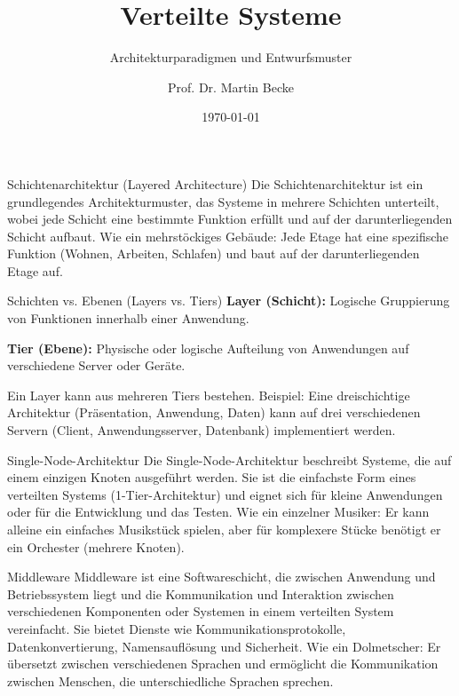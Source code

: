 \documentclass{beamer}
\title{Verteilte Systeme}
\subtitle{Architekturparadigmen und Entwurfsmuster}
\author{Prof. Dr. Martin Becke}
\date{\today}
\begin{document}
\begin{frame}
    \titlepage
\end{frame}

\begin{frame}{Schichtenarchitektur (Layered Architecture)}
    Die Schichtenarchitektur ist ein grundlegendes Architekturmuster, das Systeme in mehrere Schichten unterteilt, wobei jede Schicht eine bestimmte Funktion erfüllt und auf der darunterliegenden Schicht aufbaut.  Wie ein mehrstöckiges Gebäude: Jede Etage hat eine spezifische Funktion (Wohnen, Arbeiten, Schlafen) und baut auf der darunterliegenden Etage auf.
\end{frame}


\begin{frame}{Schichten vs. Ebenen (Layers vs. Tiers)}
    \textbf{Layer (Schicht):} Logische Gruppierung von Funktionen innerhalb einer Anwendung.

    \textbf{Tier (Ebene):}  Physische oder logische Aufteilung von Anwendungen auf verschiedene Server oder Geräte.

    Ein Layer kann aus mehreren Tiers bestehen.  Beispiel: Eine dreischichtige Architektur (Präsentation, Anwendung, Daten) kann auf drei verschiedenen Servern (Client, Anwendungsserver, Datenbank) implementiert werden.
\end{frame}


\begin{frame}{Single-Node-Architektur}
    Die Single-Node-Architektur beschreibt Systeme, die auf einem einzigen Knoten ausgeführt werden.  Sie ist die einfachste Form eines verteilten Systems (1-Tier-Architektur) und eignet sich für kleine Anwendungen oder für die Entwicklung und das Testen.  Wie ein einzelner Musiker:  Er kann alleine ein einfaches Musikstück spielen, aber für komplexere Stücke benötigt er ein Orchester (mehrere Knoten).
\end{frame}


\begin{frame}{Middleware}
    Middleware ist eine Softwareschicht, die zwischen Anwendung und Betriebssystem liegt und die Kommunikation und Interaktion zwischen verschiedenen Komponenten oder Systemen in einem verteilten System vereinfacht. Sie bietet Dienste wie Kommunikationsprotokolle, Datenkonvertierung, Namensauflösung und Sicherheit.  Wie ein Dolmetscher:  Er übersetzt zwischen verschiedenen Sprachen und ermöglicht die Kommunikation zwischen Menschen, die unterschiedliche Sprachen sprechen.
\end{frame}
\end{document}
